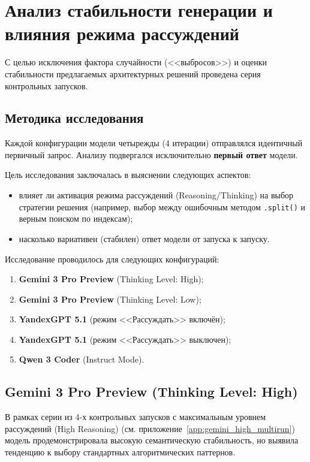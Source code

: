 \section{Анализ стабильности генерации и влияния режима рассуждений}

С целью исключения фактора случайности (<<выбросов>>) и оценки стабильности предлагаемых архитектурных решений проведена серия контрольных запусков.

\subsection{Методика исследования}
Каждой конфигурации модели четырежды (4 итерации) отправлялся идентичный первичный запрос. Анализу подвергался исключительно \textbf{первый ответ} модели.

Цель исследования заключалась в выяснении следующих аспектов:
\begin{itemize}
    \item влияет ли активация режима рассуждений (Reasoning/Thinking) на выбор стратегии решения (например, выбор между ошибочным методом \texttt{.split()} и верным поиском по индексам);
    \item насколько вариативен (стабилен) ответ модели от запуска к запуску.
\end{itemize}

Исследование проводилось для следующих конфигураций:
\begin{enumerate}
    \item \textbf{Gemini 3 Pro Preview} (Thinking Level: High);
    \item \textbf{Gemini 3 Pro Preview} (Thinking Level: Low);
    \item \textbf{YandexGPT 5.1} (режим <<Рассуждать>> включён);
    \item \textbf{YandexGPT 5.1} (режим <<Рассуждать>> выключен);
    \item \textbf{Qwen 3 Coder} (Instruct Mode).
\end{enumerate}

\subsection{Gemini 3 Pro Preview (Thinking Level: High)}

В рамках серии из 4-х контрольных запусков с максимальным уровнем рассуждений (High Reasoning) (см. приложение~\ref{app:gemini_high_multirun}) модель продемонстрировала высокую семантическую стабильность, но выявила тенденцию к выбору стандартных алгоритмических паттернов.

